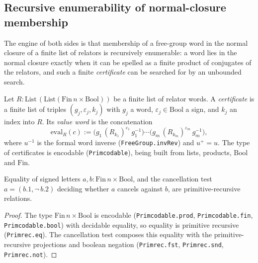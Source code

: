 \subsection{Recursive enumerability of normal-closure membership}

The engine of both sides is that membership of a free-group word in the normal
closure of a finite list of relators is recursively enumerable: a word lies in
the normal closure exactly when it can be spelled as a finite product of
conjugates of the relators, and such a finite \emph{certificate} can be searched
for by an unbounded search.

\begin{definition}
    \label{def:certificate}
    Let $R : \mathrm{List}\,(\mathrm{List}(\mathrm{Fin}\,n \times \mathrm{Bool}))$
    be a finite list of relator words. A \emph{certificate} is a finite list of
    triples $(g_j, \varepsilon_j, k_j)$ with $g_j$ a word, $\varepsilon_j \in
    \mathrm{Bool}$ a sign, and $k_j$ an index into $R$. Its \emph{value word} is
    the concatenation
    \[
        \mathrm{eval}_R(c) := \bigl(g_1\,(R_{k_1})^{\varepsilon_1}\,g_1^{-1}\bigr)
        \cdots \bigl(g_m\,(R_{k_m})^{\varepsilon_m}\,g_m^{-1}\bigr),
    \]
    where $u^{-1}$ is the formal word inverse (\texttt{FreeGroup.invRev}) and
    $u^{+}=u$. The type of certificates is encodable
    (\texttt{Primcodable}), being built from lists, products, $\mathrm{Bool}$ and
    $\mathrm{Fin}$.
\end{definition}

\begin{lemma}
    \label{lem:primrec-eq-letter}
    \leanok
    Equality of signed letters $a, b : \mathrm{Fin}\,n \times \mathrm{Bool}$, and
    the cancellation test $a = (b.1, \lnot\, b.2)$ deciding whether $a$ cancels
    against $b$, are primitive-recursive relations.
\end{lemma}
\begin{proof}
    The type $\mathrm{Fin}\,n \times \mathrm{Bool}$ is encodable
    (\texttt{Primcodable.prod}, \texttt{Primcodable.fin},
    \texttt{Primcodable.bool}) with decidable equality, so equality is primitive
    recursive (\texttt{Primrec.eq}). The cancellation test composes this equality
    with the primitive-recursive projections and boolean negation
    (\texttt{Primrec.fst}, \texttt{Primrec.snd}, \texttt{Primrec.not}).
\end{proof}


